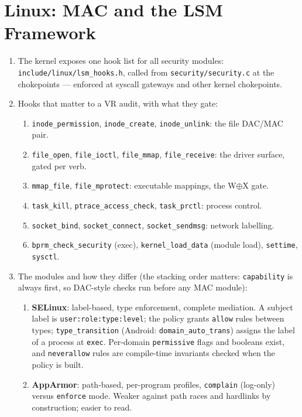 \documentclass[12pt]{Training}
\begin{document}
\section*{Linux: MAC and the LSM Framework}
\begin{enumerate}
    \item The kernel exposes one hook list for all security modules: \lstinline{include/linux/lsm_hooks.h}, called from \lstinline{security/security.c} at the chokepoints --- enforced at syscall gateways and other kernel chokepoints.
    \item Hooks that matter to a VR audit, with what they gate:
    \begin{enumerate}
        \item \lstinline{inode_permission}, \lstinline{inode_create}, \lstinline{inode_unlink}: the file DAC/MAC pair.
        \item \lstinline{file_open}, \lstinline{file_ioctl}, \lstinline{file_mmap}, \lstinline{file_receive}: the driver surface, gated per verb.
        \item \lstinline{mmap_file}, \lstinline{file_mprotect}: executable mappings, the W$\oplus$X gate.
        \item \lstinline{task_kill}, \lstinline{ptrace_access_check}, \lstinline{task_prctl}: process control.
        \item \lstinline{socket_bind}, \lstinline{socket_connect}, \lstinline{socket_sendmsg}: network labelling.
        \item \lstinline{bprm_check_security} (exec), \lstinline{kernel_load_data} (module load), \lstinline{settime}, \lstinline{sysctl}.
    \end{enumerate}
    \item The modules and how they differ (the stacking order matters: \lstinline{capability} is always first, so DAC-style checks run before any MAC module):
    \begin{enumerate}
        \item \textbf{SELinux}: label-based, type enforcement, complete mediation. A subject label is \lstinline{user:role:type:level}; the policy grants \lstinline{allow} rules between types; \lstinline{type_transition} (Android: \lstinline{domain_auto_trans}) assigns the label of a process at \lstinline{exec}. Per-domain \lstinline{permissive} flags and booleans exist, and \lstinline{neverallow} rules are compile-time invariants checked when the policy is built.
        \item \textbf{AppArmor}: path-based, per-program profiles, \lstinline{complain} (log-only) versus \lstinline{enforce} mode. Weaker against path races and hardlinks by construction; easier to read.

\end{enumerate}
\end{enumerate}
\end{document}
